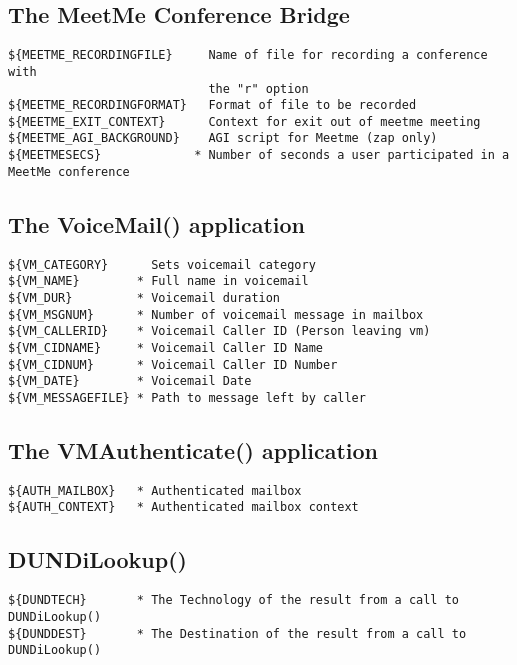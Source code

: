 \subsection{The MeetMe Conference Bridge}
\begin{verbatim}
${MEETME_RECORDINGFILE}     Name of file for recording a conference with 
                            the "r" option
${MEETME_RECORDINGFORMAT}   Format of file to be recorded
${MEETME_EXIT_CONTEXT}      Context for exit out of meetme meeting
${MEETME_AGI_BACKGROUND}    AGI script for Meetme (zap only)
${MEETMESECS}             * Number of seconds a user participated in a MeetMe conference
\end{verbatim}

\subsection{The VoiceMail() application}
\begin{verbatim}
${VM_CATEGORY}      Sets voicemail category
${VM_NAME}        * Full name in voicemail
${VM_DUR}         * Voicemail duration
${VM_MSGNUM}      * Number of voicemail message in mailbox
${VM_CALLERID}    * Voicemail Caller ID (Person leaving vm)
${VM_CIDNAME}     * Voicemail Caller ID Name
${VM_CIDNUM}      * Voicemail Caller ID Number
${VM_DATE}        * Voicemail Date
${VM_MESSAGEFILE} * Path to message left by caller
\end{verbatim}

\subsection{The VMAuthenticate() application}
\begin{verbatim}
${AUTH_MAILBOX}   * Authenticated mailbox
${AUTH_CONTEXT}   * Authenticated mailbox context
\end{verbatim}

\subsection{DUNDiLookup()}
\begin{verbatim}
${DUNDTECH}       * The Technology of the result from a call to DUNDiLookup()
${DUNDDEST}       * The Destination of the result from a call to DUNDiLookup()
\end{verbatim}

